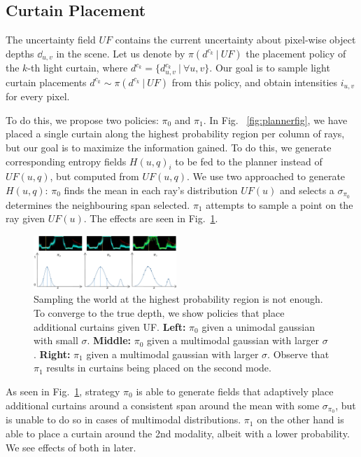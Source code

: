 \subsection{Curtain Placement}

The uncertainty field $UF$ contains the current uncertainty about pixel-wise object depths $\dd_{u, v}$ in the scene. Let us denote by $\pi(d^{c_k}\ |\ UF)$ the placement policy of the $k$-th light curtain, where $d^{c_k} = \{d^{c_k}_{u, v}\ |\ \forall u, v\}$. Our goal is to sample light curtain placements $d^{c_k} \sim \pi(d^{c_k}\ |\ UF)$ from this policy, and obtain intensities $i_{u, v}$ for every pixel.

To do this, we propose two policies: $\pi_{0}$ and $\pi_{1}$. In Fig. ~\ref{fig:plannerfig}, we have placed a single curtain along the highest probability region per column of rays, but our goal is to maximize the information gained. To do this, we generate corresponding entropy fields $H(u, q)_{i}$ to be fed to the planner instead of $UF(u, q)$, but computed from $UF(u, q)$. We use two approached to generate $H(u, q)$: $\pi_{0}$ finds the mean in each ray's distribution $UF(u)$ and selects a $\sigma_{\pi_{0}}$ determines the neighbouring span selected. $\pi_{1}$ attempts to sample a point on the ray given $UF(u)$. The effects are seen in Fig.~\ref{fig:m0m1}.

\begin{figure}[h]
   \centering
       \centering
       \includegraphics[width=0.48\textwidth]{figures/fields.pdf}
   \centering
   \caption{Sampling the world at the highest probability region is not enough. To converge to the true depth, we show policies that place additional curtains given UF. \textbf{Left:} $\pi_{0}$ given a unimodal gaussian with small $\sigma$. \textbf{Middle:} $\pi_{0}$ given a multimodal gaussian with larger $\sigma$. \textbf{Right:} $\pi_{1}$ given a multimodal gaussian with larger $\sigma$. Observe that $\pi_{1}$ results in curtains being placed on the second mode.} 
   \label{fig:m0m1} 
\end{figure}

As seen in Fig.~\ref{fig:m0m1}, strategy $\pi_{0}$ is able to generate fields that adaptively place additional curtains around a consistent span around the mean with some $\sigma_{\pi_{0}}$, but is unable to do so in cases of multimodal distributions. $\pi_{1}$ on the other hand is able to place a curtain around the 2nd modality, albeit with a lower probability. We see effects of both in later.

